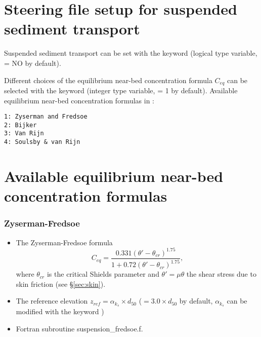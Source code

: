 \section{Steering file setup for suspended sediment transport}
Suspended sediment transport can be set with the keyword  (logical type variable, {\ttfamily = NO} by default). 

Different choices of the equilibrium near-bed concentration formula $C_{eq}$ can be selected with the keyword  (integer type variable, {\ttfamily = 1} by default). Available equilibrium near-bed concentration formulas in \sisyphe{}:
\begin{verbatim}
1: Zyserman and Fredsoe
2: Bijker 
3: Van Rijn 
4: Soulsby & van Rijn 
\end{verbatim}

\section{Available equilibrium near-bed concentration formulas}\label{sec:concform}
\subsubsection{Zyserman-Fredsoe}
\begin{itemize}
\item The Zyserman-Fredsoe formula~\cite{Zyserman} 
\begin{equation*}
C_{eq} =\frac{0.331(\theta'-\theta_{cr})^{1.75}}{1+0.72(\theta'-\theta_{cr})^{1.75}}, 
\end{equation*}
where $\theta_{cr}$ is the critical Shields parameter and $\theta'= \mu\theta$ the shear stress due to skin friction (see \S\ref{sec:skin}). 
\item The reference elevation $z_{ref}=\alpha_{k_s}\times d_{50}$ ($=3.0\times d_{50}$ by default, $\alpha_{k_s}$ can be modified with the keyword )
\item Fortran subroutine {\ttfamily suspension\_fredsoe.f}.
\end{itemize}


